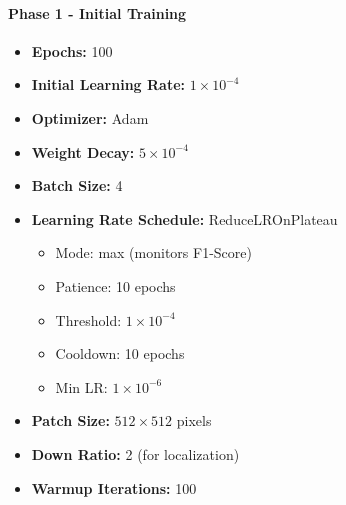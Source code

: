 \paragraph{Phase 1 - Initial Training}
\begin{itemize}
    \item \textbf{Epochs:} 100
    \item \textbf{Initial Learning Rate:} $1 \times 10^{-4}$
    \item \textbf{Optimizer:} Adam
    \item \textbf{Weight Decay:} $5 \times 10^{-4}$
    \item \textbf{Batch Size:} 4
    \item \textbf{Learning Rate Schedule:} ReduceLROnPlateau
    \begin{itemize}
        \item Mode: max (monitors F1-Score)
        \item Patience: 10 epochs
        \item Threshold: $1 \times 10^{-4}$
        \item Cooldown: 10 epochs
        \item Min LR: $1 \times 10^{-6}$
    \end{itemize}
    \item \textbf{Patch Size:} $512 \times 512$ pixels
    \item \textbf{Down Ratio:} 2 (for localization)
    \item \textbf{Warmup Iterations:} 100
\end{itemize}

